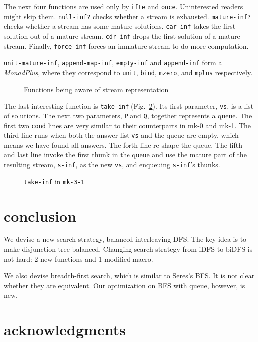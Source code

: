 \documentclass[format=acmlarge, review=true, authordraft=true]{acmart}
\begin{document}
The next four functions are used only by \texttt{ifte} and \texttt{once}. 
Uninterested readers might skip them. \texttt{null-inf?} checks whether a stream 
is exhausted. \texttt{mature-inf?} checks whether a stream has some mature 
solutions. \texttt{car-inf} takes the first solution out of a mature stream. 
\texttt{cdr-inf} drops the first solution of a mature stream. Finally, 
\texttt{force-inf} forces an immature stream to do more computation.

\texttt{unit-mature-inf}, \texttt{append-map-inf}, \texttt{empty-inf} and 
\texttt{append-inf} form a \emph{MonadPlus}, where they correspond to 
\texttt{unit}, \texttt{bind}, \texttt{mzero}, and \texttt{mplus} respectively.

\begin{figure}
	 	
	 \caption{Functions being aware of stream representation}
	 \label{interface}
\end{figure}

The last interesting function is \texttt{take-inf} (Fig.~\ref{take-inf-3-1}). 
Its first parameter, \texttt{vs}, is a list of solutions. The next two parameters, \texttt{P} and \texttt{Q}, together represents a queue. 
The first two \texttt{cond} lines are very similar to their counterparts in mk-0 and mk-1. The third line runs when both the answer list \texttt{vs} and the queue are empty, which means we have found all answers. The forth line re-shape the queue. The fifth and last line invoke the first thunk in the queue and use the mature part of the resulting stream, \texttt{s-inf}, as the new \texttt{vs}, and enqueuing \texttt{s-inf}'s thunks. 

\begin{figure}
	 	
	 \caption{\texttt{take-inf} in \texttt{mk-3-1}}
	 \label{take-inf-3-1}
\end{figure}



\section{conclusion}


We devise a new search strategy, balanced interleaving DFS. The key idea is to 
make disjunction tree balanced. Changing search strategy from iDFS to biDFS is 
not hard: 2 new functions and 1 modified macro. 

We also devise breadth-first search, which is similar to Seres's BFS. It is not clear whether they are equivalent. Our optimization on BFS with queue, however, is new.

\section*{acknowledgments}



\end{document}
